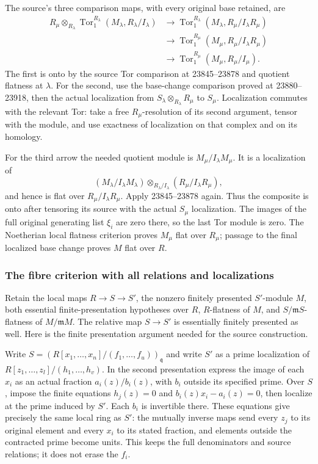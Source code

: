 The source's three comparison maps, with every original base retained, are \[
\begin{aligned}
R_\mu\otimes_{R_\lambda}\operatorname{Tor}_1^{R_\lambda}
 (M_\lambda,R_\lambda/I_\lambda)
&\longrightarrow \operatorname{Tor}_1^{R_\lambda}
 (M_\lambda,R_\mu/I_\lambda R_\mu)\\
&\longrightarrow \operatorname{Tor}_1^{R_\mu}
 (M_\mu,R_\mu/I_\lambda R_\mu)\\
&\longrightarrow \operatorname{Tor}_1^{R_\mu}
 (M_\mu,R_\mu/I_\mu).
\end{aligned}
\] The first is onto by the source Tor comparison at 23845--23878 and quotient flatness at \(\lambda\). For the second, use the base-change comparison proved at 23880--23918, then the actual localization from \(S_\lambda\otimes_{R_\lambda}R_\mu\) to \(S_\mu\). Localization commutes with the relevant Tor: take a free \(R_\mu\)-resolution of its second argument, tensor with the module, and use exactness of localization on that complex and on its homology.

For the third arrow the needed quotient module is \(M_\mu/I_\lambda M_\mu\). It is a localization of \[
(M_\lambda/I_\lambda M_\lambda)
 \otimes_{R_\lambda/I_\lambda}(R_\mu/I_\lambda R_\mu),
\] and hence is flat over \(R_\mu/I_\lambda R_\mu\). Apply 23845--23878 again. Thus the composite is onto after tensoring its source with the actual \(S_\mu\) localization. The images of the full original generating list \(\xi_i\) are zero there, so the last Tor module is zero. The Noetherian local flatness criterion proves \(M_\mu\) flat over \(R_\mu\); passage to the final localized base change proves \(M\) flat over \(R\).

\subsubsection{The fibre criterion with all relations and localizations}\label{algebra-proof-038-the-fibre-criterion-with-all-relations-and-localizations}

Retain the local maps \(R\to S\to S'\), the nonzero finitely presented \(S'\)-module \(M\), both essential finite-presentation hypotheses over \(R\), \(R\)-flatness of \(M\), and \(S/\mathfrak mS\)-flatness of \(M/\mathfrak mM\). The relative map \(S\to S'\) is essentially finitely presented as well. Here is the finite presentation argument needed for the source construction.

Write \(S=(R[x_1,\ldots,x_n]/(f_1,\ldots,f_u))_{\mathfrak q}\) and write \(S'\) as a prime localization of \(R[z_1,\ldots,z_l]/(h_1,\ldots,h_v)\). In the second presentation express the image of each \(x_i\) as an actual fraction \(a_i(z)/b_i(z)\), with \(b_i\) outside its specified prime. Over \(S\), impose the finite equations \(h_j(z)=0\) and \(b_i(z)x_i-a_i(z)=0\), then localize at the prime induced by \(S'\). Each \(b_i\) is invertible there. These equations give precisely the same local ring as \(S'\): the mutually inverse maps send every \(z_j\) to its original element and every \(x_i\) to its stated fraction, and elements outside the contracted prime become units. This keeps the full denominators and source relations; it does not erase the \(f_i\).

